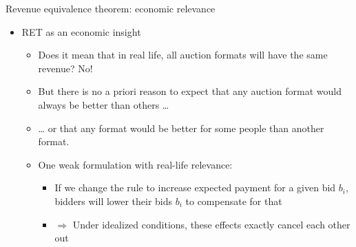 \documentclass[bigger]{beamer}
\newcommand{\Ra}{\Rightarrow} \newcommand{\ra}{\rightarrow} \newcommand{\Lra}{\Leftrightarrow}
\begin{document}
\begin{frame}[label={sec:org2186384}]{Revenue equivalence theorem: economic relevance}
\begin{itemize}
\item RET as an economic insight
\begin{itemize}
\item Does it mean that in real life, all auction formats will have the same revenue? No!
\item But there is no a priori reason to expect that any auction format would always be better than others \ldots{}
\item \ldots{} or that any format would be better for some people than another format.
\item One weak formulation with real-life relevance:
\begin{itemize}
\item If we change the rule to increase expected payment for a given bid \(b_i\), bidders will lower their bids \(b_i\) to compensate for that
\item \(\Ra\) Under idealized conditions, these effects exactly cancel each other out
\end{itemize}
\end{itemize}
\end{itemize}
\end{frame}
\end{document}
